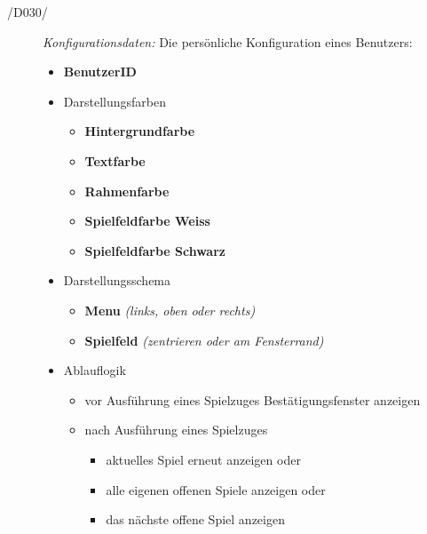 \begin{description}
  \item[/D030/]
    \textit{Konfigurationsdaten:} Die persönliche Konfiguration eines Benutzers:
    \begin{itemize}
      \item \textbf{BenutzerID}
      \item Darstellungsfarben
        \begin{itemize}
          \item \textbf{Hintergrundfarbe}
          \item \textbf{Textfarbe}
          \item \textbf{Rahmenfarbe}
          \item \textbf{Spielfeldfarbe Weiss}
          \item \textbf{Spielfeldfarbe Schwarz}
        \end{itemize}
      \item Darstellungsschema
        \begin{itemize}
          \item \textbf{Menu} \textit{(links, oben oder rechts)}
          \item \textbf{Spielfeld} \textit{(zentrieren oder am Fensterrand)}
        \end{itemize}
      \item Ablauflogik
        \begin{itemize}
          \item vor Ausführung eines Spielzuges Bestätigungsfenster anzeigen
          \item nach Ausführung eines Spielzuges
            \begin{itemize}
              \item aktuelles Spiel erneut anzeigen oder
              \item alle eigenen offenen Spiele anzeigen oder
              \item das nächste offene Spiel anzeigen
            \end{itemize}
        \end{itemize}
    \end{itemize}
\end{description}

